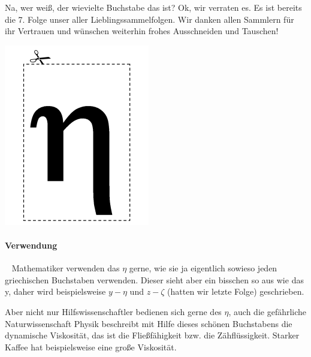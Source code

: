 {Na, wer weiß, der wievielte Buchstabe das ist? Ok, wir verraten es. Es ist
bereits die 7. Folge unser aller Lieblingssammelfolgen. Wir danken allen
Sammlern für ihr Vertrauen und wünschen weiterhin frohes Ausschneiden und
Tauschen!}
{\includegraphics[width=\columnwidth]{grafik/eta}

\paragraph{Verwendung}~\newline
Mathematiker verwenden das $\eta$ gerne, wie sie ja eigentlich sowieso jeden
griechischen Buchstaben verwenden. Dieser sieht aber ein bisschen so aus wie
das y, daher wird beispielsweise $y - \eta$ und $z - \zeta$ (hatten wir letzte Folge)
geschrieben. 

Aber nicht nur Hilfswissenschaftler bedienen sich gerne des $\eta$, auch die
gefährliche Naturwissenschaft Physik beschreibt mit Hilfe dieses schönen
Buchstabens die dynamische Viskosität, das ist die Fließfähigkeit bzw. die
Zähflüssigkeit. Starker Kaffee hat beispielsweise eine große Viskosität. 

}
